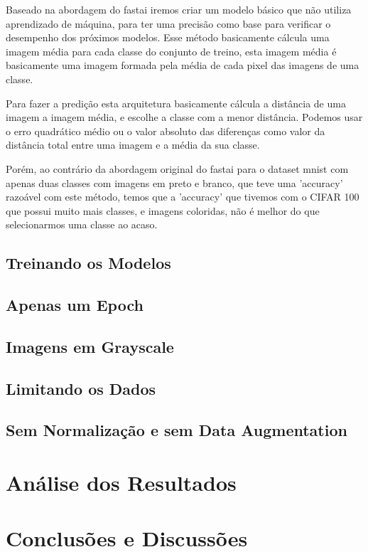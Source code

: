 \documentclass[conference]{IEEEtran}
\begin{document}
Baseado na abordagem do fastai \cite{howard2020deep}
iremos criar um modelo básico que não utiliza aprendizado de máquina, 
para ter uma precisão como base para verificar o desempenho dos próximos modelos.
 Esse método basicamente cálcula uma imagem média para cada classe do conjunto de treino, 
 esta imagem média é basicamente uma imagem formada pela média de cada pixel das imagens de uma classe.

Para fazer a predição esta arquitetura basicamente cálcula a distância de uma imagem a imagem média,
e escolhe a classe com a menor distância.
Podemos usar o erro quadrático médio ou o valor absoluto das diferenças como valor da distância total entre uma imagem e a média da sua classe.

Porém, ao contrário da abordagem original do fastai para o dataset mnist com apenas duas classes com imagens em preto e branco, 
que teve uma 'accuracy' razoável com este método, temos que a 'accuracy' que tivemos com o CIFAR 100 que possui muito mais classes,
e imagens coloridas, não é melhor do que selecionarmos uma classe ao acaso.

\subsection{Treinando os Modelos}

\subsection{Apenas um Epoch}

\subsection{Imagens em Grayscale}

\subsection{Limitando os Dados}


\subsection{Sem Normalização e sem Data Augmentation}






\section{Análise dos Resultados}




\section{Conclusões e Discussões}



\nocite{*}

\end{document}
